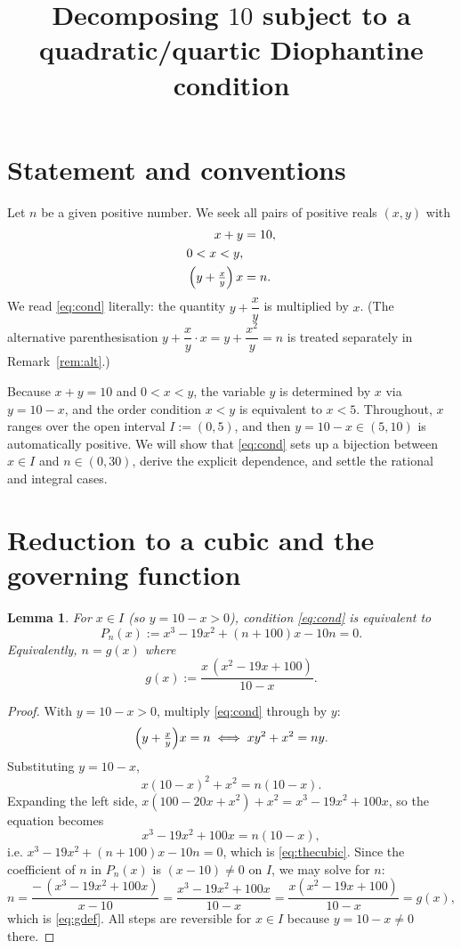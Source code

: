 \documentclass{amsart}
\newtheorem{lemma}{Lemma}
\theoremstyle{remark}
\begin{document}
\title{Decomposing $10$ subject to a quadratic/quartic Diophantine condition}
\maketitle

\section{Statement and conventions}

Let $n$ be a given positive number. We seek all pairs of positive reals
$(x,y)$ with
\begin{align}
x+y&=10, \label{eq:sum}\\
0<x<y, \label{eq:order}\\
\Bigl(y+\tfrac{x}{y}\Bigr)\,x&=n. \label{eq:cond}
\end{align}
We read \eqref{eq:cond} literally: the quantity $y+\dfrac{x}{y}$ is multiplied
by $x$. (The alternative parenthesisation $y+\dfrac{x}{y}\cdot x=y+\dfrac{x^{2}}{y}=n$
is treated separately in Remark~\ref{rem:alt}.)

Because $x+y=10$ and $0<x<y$, the variable $y$ is determined by $x$ via
$y=10-x$, and the order condition $x<y$ is equivalent to $x<5$. Throughout,
$x$ ranges over the open interval $I:=(0,5)$, and then $y=10-x\in(5,10)$ is
automatically positive. We will show that \eqref{eq:cond} sets up a bijection
between $x\in I$ and $n\in(0,30)$, derive the explicit dependence, and settle
the rational and integral cases.

\section{Reduction to a cubic and the governing function}

\begin{lemma}\label{lem:cubic}
For $x\in I$ (so $y=10-x>0$), condition \eqref{eq:cond} is equivalent to
\begin{equation}\label{eq:thecubic}
P_n(x):=x^{3}-19x^{2}+(n+100)x-10n=0 .
\end{equation}
Equivalently, $n=g(x)$ where
\begin{equation}\label{eq:gdef}
g(x):=\frac{x\,(x^{2}-19x+100)}{10-x}.
\end{equation}
\end{lemma}

\begin{proof}
With $y=10-x>0$, multiply \eqref{eq:cond} through by $y$:
\[
\Bigl(y+\tfrac{x}{y}\Bigr)x=n
\;\Longleftrightarrow\;
xy^{2}+x^{2}=ny .
\]
Substituting $y=10-x$,
\[
x(10-x)^{2}+x^{2}=n(10-x).
\]
Expanding the left side, $x(100-20x+x^{2})+x^{2}=x^{3}-19x^{2}+100x$, so the
equation becomes
\[
x^{3}-19x^{2}+100x=n(10-x),
\]
i.e. $x^{3}-19x^{2}+(n+100)x-10n=0$, which is \eqref{eq:thecubic}. Since the
coefficient of $n$ in $P_n(x)$ is $(x-10)\neq0$ on $I$, we may solve for $n$:
\[
n=\frac{-\,(x^{3}-19x^{2}+100x)}{x-10}
 =\frac{x^{3}-19x^{2}+100x}{10-x}
 =\frac{x(x^{2}-19x+100)}{10-x}=g(x),
\]
which is \eqref{eq:gdef}. All steps are reversible for $x\in I$ because
$y=10-x\neq0$ there.
\end{proof}
\end{document}
